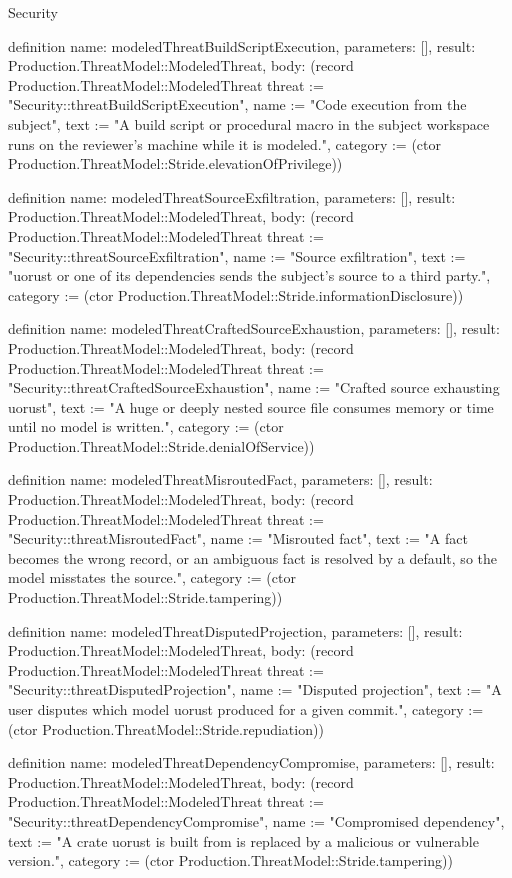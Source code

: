 \begin{lexlean}{Security}
\begin{semanticmodule}
definition{
  name: modeledThreatBuildScriptExecution,
  parameters: [],
  result: Production.ThreatModel::ModeledThreat,
  body: (record Production.ThreatModel::ModeledThreat {threat := "Security::threatBuildScriptExecution", name := "Code execution from the subject", text := "A build script or procedural macro in the subject workspace runs on the reviewer's machine while it is modeled.", category := (ctor Production.ThreatModel::Stride.elevationOfPrivilege)})
}

definition{
  name: modeledThreatSourceExfiltration,
  parameters: [],
  result: Production.ThreatModel::ModeledThreat,
  body: (record Production.ThreatModel::ModeledThreat {threat := "Security::threatSourceExfiltration", name := "Source exfiltration", text := "uorust or one of its dependencies sends the subject's source to a third party.", category := (ctor Production.ThreatModel::Stride.informationDisclosure)})
}

definition{
  name: modeledThreatCraftedSourceExhaustion,
  parameters: [],
  result: Production.ThreatModel::ModeledThreat,
  body: (record Production.ThreatModel::ModeledThreat {threat := "Security::threatCraftedSourceExhaustion", name := "Crafted source exhausting uorust", text := "A huge or deeply nested source file consumes memory or time until no model is written.", category := (ctor Production.ThreatModel::Stride.denialOfService)})
}

definition{
  name: modeledThreatMisroutedFact,
  parameters: [],
  result: Production.ThreatModel::ModeledThreat,
  body: (record Production.ThreatModel::ModeledThreat {threat := "Security::threatMisroutedFact", name := "Misrouted fact", text := "A fact becomes the wrong record, or an ambiguous fact is resolved by a default, so the model misstates the source.", category := (ctor Production.ThreatModel::Stride.tampering)})
}

definition{
  name: modeledThreatDisputedProjection,
  parameters: [],
  result: Production.ThreatModel::ModeledThreat,
  body: (record Production.ThreatModel::ModeledThreat {threat := "Security::threatDisputedProjection", name := "Disputed projection", text := "A user disputes which model uorust produced for a given commit.", category := (ctor Production.ThreatModel::Stride.repudiation)})
}

definition{
  name: modeledThreatDependencyCompromise,
  parameters: [],
  result: Production.ThreatModel::ModeledThreat,
  body: (record Production.ThreatModel::ModeledThreat {threat := "Security::threatDependencyCompromise", name := "Compromised dependency", text := "A crate uorust is built from is replaced by a malicious or vulnerable version.", category := (ctor Production.ThreatModel::Stride.tampering)})
}


\end{semanticmodule}
\end{lexlean}
